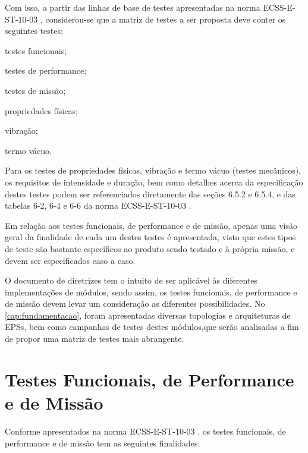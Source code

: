 
Com isso, a partir das linhas de base de testes apresentadas na norma ECSS-E-ST-10-03 \cite{ecss-e-st-10-03}, considerou-se que a matriz de testes a ser proposta deve conter os seguintes testes:

\begin{alineas}
    \item testes funcionais;
    \item testes de performance;
    \item testes de missão;
    \item propriedades físicas;
    \item vibração;
    \item termo vácuo.
\end{alineas}




Para os testes de propriedades físicas, vibração e termo vácuo (testes mecânicos), os requisitos de intensidade e duração, bem como detalhes acerca da especificação destes testes podem ser referenciados diretamente das seções 6.5.2 e 6.5.4, e das tabelas 6-2, 6-4 e 6-6 da norma ECSS-E-ST-10-03 \cite{ecss-e-st-10-03}.

Em relação aos testes funcionais, de performance e de missão, apenas uma visão geral da finalidade de cada um destes testes é apresentada, visto que estes tipos de teste são bastante específicos ao produto sendo testado e à própria missão, e devem ser especificados caso a caso.

O documento de diretrizes tem o intuito de ser aplicável às diferentes implementações de módulos, sendo assim, os testes funcionais, de performance e de missão devem levar um consideração as diferentes possibilidades.
No \autoref{cap:fundamentacao}, foram apresentadas diversas topologias e arquiteturas de \gls{EPS}s, bem como campanhas de testes destes módulos,que serão analisadas a fim de propor uma matriz de testes mais abrangente.


\section{Testes Funcionais, de Performance e de Missão} \label{sec:analises-testes}

Conforme apresentados na norma ECSS-E-ST-10-03 \cite{ecss-e-st-10-03}, os testes funcionais, de performance e de missão tem as seguintes finalidades:


